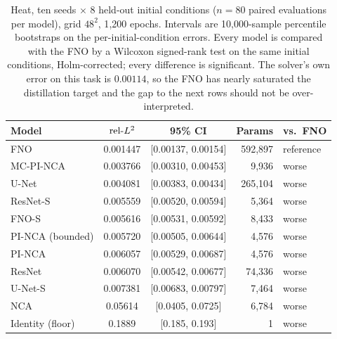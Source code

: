 \begin{table}[t]
\centering
\caption{Heat, ten seeds $\times$ 8 held-out initial conditions ($n=80$ paired
evaluations per model), grid $48^2$, 1{,}200 epochs. Intervals are 10{,}000-sample
percentile bootstraps on the per-initial-condition errors. Every model is compared with
the FNO by a Wilcoxon signed-rank test on the same initial conditions, Holm-corrected;
every difference is significant. The solver's own error on this task is $0.00114$, so the
FNO has nearly saturated the distillation target and the gap to the next rows should not
be over-interpreted.}
\label{tab:heatms}
\small
\begin{tabular}{lccrl}
\toprule
Model & $\mathrm{rel}\mbox{-}L^2$ & 95\% CI & Params & vs.\ FNO \\
\midrule
FNO               & 0.001447 & [0.00137, 0.00154] & 592{,}897 & reference \\
MC-PI-NCA         & 0.003766 & [0.00310, 0.00453] & 9{,}936   & worse \\
U-Net             & 0.004081 & [0.00383, 0.00434] & 265{,}104 & worse \\
ResNet-S          & 0.005559 & [0.00520, 0.00594] & 5{,}364   & worse \\
FNO-S             & 0.005616 & [0.00531, 0.00592] & 8{,}433   & worse \\
PI-NCA (bounded)  & 0.005720 & [0.00505, 0.00644] & 4{,}576   & worse \\
PI-NCA            & 0.006057 & [0.00529, 0.00687] & 4{,}576   & worse \\
ResNet            & 0.006070 & [0.00542, 0.00677] & 74{,}336  & worse \\
U-Net-S           & 0.007381 & [0.00683, 0.00797] & 7{,}464   & worse \\
NCA               & 0.05614  & [0.0405, 0.0725]   & 6{,}784   & worse \\
Identity (floor)  & 0.1889   & [0.185, 0.193]     & 1         & worse \\
\bottomrule
\end{tabular}
\end{table}
